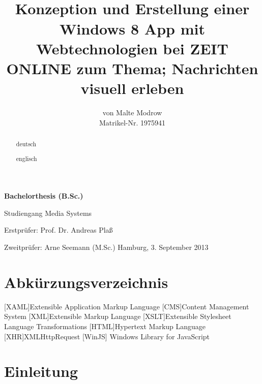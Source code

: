 \documentclass[12pt,a4paper,bibtotoc,abstracton]{scrartcl}
\author{von Malte Modrow \\ Matrikel-Nr. 1975941}
\title{\HRule \\ Konzeption und Erstellung einer Windows 8 App mit Webtechnologien bei ZEIT ONLINE zum Thema; Nachrichten visuell erleben \HRule}
\date{}
\begin{document}
\maketitle
\thispagestyle{empty}
\begin{center}		
	\LARGE
	\textbf{Bachelorthesis (B.Sc.)}
	
	\Large 
	Studiengang Media Systems 
	
	\vfill	
	\large
  	Erstprüfer: Prof. Dr. Andreas Plaß
	
	Zweitprüfer: Arne Seemann (M.Sc.)
	\vfill
	Hamburg, 3. September 2013	
\end{center}

\newpage
{}
\begin{abstract}
	deutsch
\end{abstract}

\begin{abstract}
	englisch
\end{abstract}

\newpage
\thispagestyle{plain}
\tableofcontents
\thispagestyle{plain}

\newpage
\listoffigures
\vspace{2cm}
\listoftables

\newpage
\lstlistoflistings
\vspace{2cm}
\section*{Abkürzungsverzeichnis}
\label{sec:abkürzungen}
\begin{acronym}[SEPSEP]
	[XAML]{Extensible Application Markup Language}
	 [CMS]{Content Management System}
	 [XML]{Extensible Markup Language}
	[XSLT]{Extensible Stylesheet Language Transformations}
	[HTML]{Hypertext Markup Language}
	[XHR]{XMLHttpRequest}
	[WinJS] {Windows Library for JavaScript}
\end{acronym}

\newpage
\setcounter{page}{1}
\section{Einleitung}
\label{sec:einleitung}
\newpage
\end{document}
